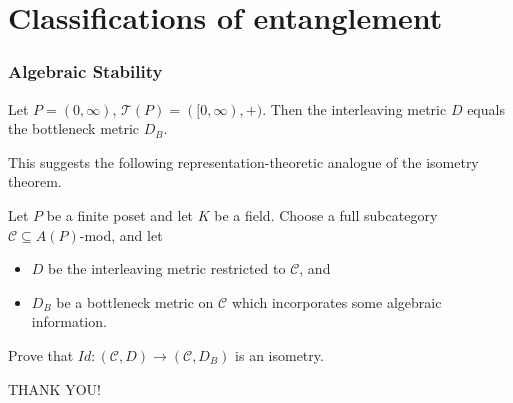 \documentclass[handout, 10 pt]{beamer}
\begin{document}
\section{Classifications of entanglement}

\begin{frame}
\frametitle{Algebraic Stability}


\pause

\begin{block}{}
\begin{theorem}
Let $P = (0,\infty)$, ${\mathcal{T}}(P) = ([0,\infty),+)$.  Then the interleaving metric $D$ equals the bottleneck metric $D_B$.
\end{theorem}
\end{block}

\pause
\smallskip

This suggests the following representation-theoretic analogue of the isometry theorem.
\pause

\smallskip

Let $P$ be a finite poset and let $K$ be a field.  Choose a full subcategory  $\mathcal{C} \subseteq A(P)$-mod, and let 
\begin{itemize}
\pause
\item $D$ be the interleaving metric restricted to $\mathcal{C}$, and
\pause
\item $D_B$ be a bottleneck metric on $\mathcal{C}$ which incorporates some algebraic information.
\end{itemize}
\pause
Prove that $Id:(\mathcal{C},D) \to(\mathcal{C},D_B) $ is an isometry.
\end{frame}



\begin{frame}


\begin{center}
\huge{THANK YOU!}


\end{center}

\end{frame}

















\end{document}
